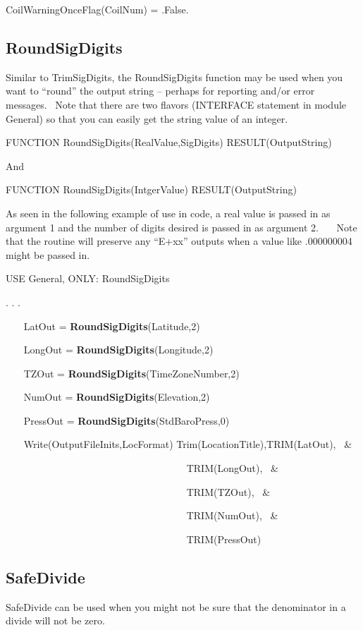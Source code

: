 CoilWarningOnceFlag(CoilNum) = .False.

\subsection{RoundSigDigits}\label{roundsigdigits}

Similar to TrimSigDigits, the RoundSigDigits function may be used when you want to ``round'' the output string -- perhaps for reporting and/or error messages.~ Note that there are two flavors (INTERFACE statement in module General) so that you can easily get the string value of an integer.

FUNCTION RoundSigDigits(RealValue,SigDigits) RESULT(OutputString)

And

FUNCTION RoundSigDigits(IntgerValue) RESULT(OutputString)

As seen in the following example of use in code, a real value is passed in as argument 1 and the number of digits desired is passed in as argument 2.~~~ Note that the routine will preserve any ``E+xx'' outputs when a value like .000000004 might be passed in.

USE General, ONLY: RoundSigDigits

. . .

~~~ LatOut = \textbf{RoundSigDigits}(Latitude,2)

~~~ LongOut = \textbf{RoundSigDigits}(Longitude,2)

~~~ TZOut = \textbf{RoundSigDigits}(TimeZoneNumber,2)

~~~ NumOut = \textbf{RoundSigDigits}(Elevation,2)

~~~ PressOut = \textbf{RoundSigDigits}(StdBaroPress,0)

~~~ Write(OutputFileInits,LocFormat) Trim(LocationTitle),TRIM(LatOut),~ \&

~~~~~~~~~~~~~~~~~~~~~~~~~~~~~~~~~~~~ TRIM(LongOut),~ \&

~~~~~~~~~~~~~~~~~~~~~~~~~~~~~~~~~~~~ TRIM(TZOut),~ \&

~~~~~~~~~~~~~~~~~~~~~~~~~~~~~~~~~~~~ TRIM(NumOut),~ \&

~~~~~~~~~~~~~~~~~~~~~~~~~~~~~~~~~~~~ TRIM(PressOut)

\subsection{SafeDivide}\label{safedivide}

SafeDivide can be used when you might not be sure that the denominator in a divide will not be zero.

